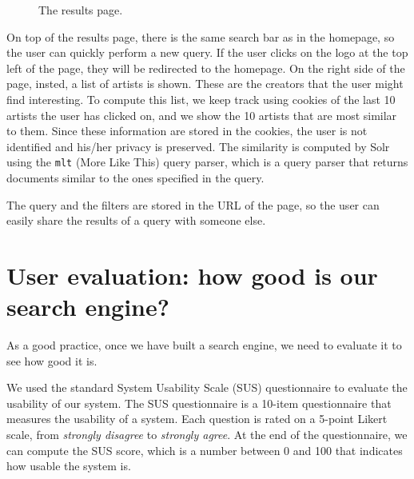 \documentclass[tikz,14pt]{article}
\begin{document}
\begin{figure}[H]
    \centering
    \caption{The results page.}
    \label{fig:resultspage}
\end{figure}


On top of the results page, there is the same search bar as in the homepage, so the user can quickly perform a new query.
If the user clicks on the logo at the top left of the page, they will be redirected to the homepage.
On the right side of the page, insted, a list of artists is shown. These are the creators that the user might find interesting.
To compute this list, we keep track using cookies of the last 10 artists the user has clicked on, and we show the 10 artists that are most similar to them.
Since these information are stored in the cookies, the user is not identified and his/her privacy is preserved.
The similarity is computed by Solr using the \texttt{mlt} (More Like This) query parser, which is a query parser that returns documents similar to the ones specified in the query.

The query and the filters are stored in the URL of the page, so the user can easily share the results of a query with someone else.


\section{User evaluation: how good is our search engine?} \label{sec:evaluation}
As a good practice, once we have built a search engine, we need to evaluate it to see how good it is.

We used the standard System Usability Scale (SUS) questionnaire to evaluate the usability of our system.
The SUS questionnaire is a 10-item questionnaire that measures the usability of a system.
Each question is rated on a 5-point Likert scale, from \textit{strongly disagree} to \textit{strongly agree}.
At the end of the questionnaire, we can compute the SUS score, which is a number between 0 and 100 that indicates how usable the system is.
\end{document}
